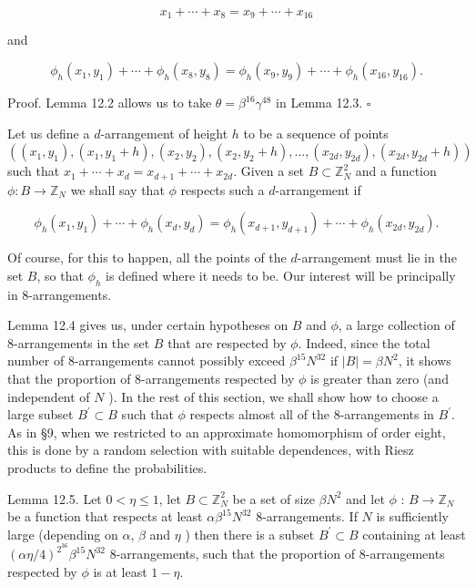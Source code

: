 \documentclass[10pt]{article}
\begin{document}
$$
x_{1}+\cdots+x_{8}=x_{9}+\cdots+x_{16}
$$

and

$$
\phi_{h}\left(x_{1}, y_{1}\right)+\cdots+\phi_{h}\left(x_{8}, y_{8}\right)=\phi_{h}\left(x_{9}, y_{9}\right)+\cdots+\phi_{h}\left(x_{16}, y_{16}\right) .
$$

Proof. Lemma 12.2 allows us to take $\theta=\beta^{16} \gamma^{48}$ in Lemma 12.3. \(\square\)

Let us define a $d$-arrangement of height $h$ to be a sequence of points $\left(\left(x_{1}, y_{1}\right),\left(x_{1}, y_{1}+h\right),\left(x_{2}, y_{2}\right),\left(x_{2}, y_{2}+h\right), \ldots,\left(x_{2 d}, y_{2 d}\right),\left(x_{2 d}, y_{2 d}+h\right)\right)$ such that $x_{1}+\cdots+x_{d}=x_{d+1}+\cdots+x_{2 d}$. Given a set $B \subset \mathbb{Z}_{N}^{2}$ and a function $\phi: B \rightarrow \mathbb{Z}_{N}$ we shall say that $\phi$ respects such a $d$-arrangement if

$$
\phi_{h}\left(x_{1}, y_{1}\right)+\cdots+\phi_{h}\left(x_{d}, y_{d}\right)=\phi_{h}\left(x_{d+1}, y_{d+1}\right)+\cdots+\phi_{h}\left(x_{2 d}, y_{2 d}\right) .
$$

Of course, for this to happen, all the points of the $d$-arrangement must lie in the set $B$, so that $\phi_{h}$ is defined where it needs to be. Our interest will be principally in 8-arrangements.

Lemma 12.4 gives us, under certain hypotheses on $B$ and $\phi$, a large collection of 8-arrangements in the set $B$ that are respected by $\phi$. Indeed, since the total number of 8-arrangements cannot possibly exceed $\beta^{15} N^{32}$ if $|B|=\beta N^{2}$, it shows that the proportion of 8-arrangements respected by $\phi$ is greater than zero (and independent of $N$ ). In the rest of this section, we shall show how to choose a large subset $B^{\prime} \subset B$ such that $\phi$ respects almost all of the 8-arrangements in $B^{\prime}$. As in §9, when we restricted to an approximate homomorphism of order eight, this is done by a random selection with suitable dependences, with Riesz products to define the probabilities.

Lemma 12.5. Let $0<\eta\leq 1$, let $B \subset \mathbb{Z}_{N}^{2}$ be a set of size $\beta N^{2}$ and let $\phi$ : $B \rightarrow \mathbb{Z}_{N}$ be a function that respects at least $\alpha \beta^{15} N^{32}$ 8-arrangements. If $N$ is sufficiently large (depending on $\alpha$, $\beta$ and $\eta$ ) then there is a subset $B^{\prime} \subset B$ containing at least $(\alpha \eta / 4)^{2^{36}} \beta^{15} N^{32}$ 8-arrangements, such that the proportion of 8-arrangements respected by $\phi$ is at least $1-\eta$.
\end{document}
